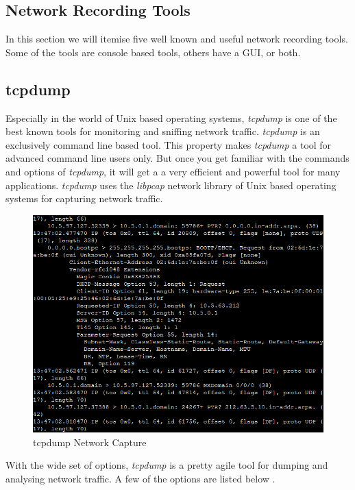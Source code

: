 \documentclass[conference]{IEEEtran}
\begin{document}
\subsection{Network Recording Tools}

In this section we will itemise five well known and useful network recording tools. Some of the tools are console based tools, others have a GUI, or both.

\subsection*{tcpdump}

Especially in the world of Unix based operating systems, \textit{tcpdump} is one of the best known tools for monitoring and sniffing network traffic. \textit{tcpdump} is an exclusively command line based tool. This property makes \textit{tcpdump} a tool for advanced command line users only. But once you get familiar with the commands and options of \textit{tcpdump}, it will get a  a very efficient and powerful tool for many applications. \textit{tcpdump} uses the \textit{libpcap} network library of Unix based operating systems for capturing network traffic.

\begin{figure}[htbp]
\centerline{\includegraphics[scale=0.4]{tcpdump.png}}
\caption{tcpdump Network Capture}
\label{tcpdump}
\end{figure}

With the wide set of options, \textit{tcpdump} is a pretty agile tool for dumping and analysing network traffic. A few of the options are listed below \cite{tcpdumporg}. 
\end{document}
